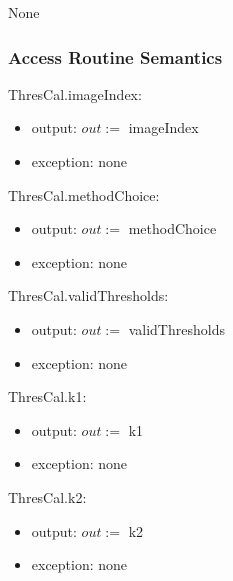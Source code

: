 \documentclass[12pt, titlepage]{article}
\begin{document}
None

\subsubsection{Access Routine Semantics}

\noindent ThresCal.imageIndex:
\begin{itemize}
\item output: $out :=$ imageIndex
\item exception: none 
\end{itemize}

\noindent ThresCal.methodChoice:
\begin{itemize}
\item output: $out :=$ methodChoice
\item exception: none 
\end{itemize}

\noindent ThresCal.validThresholds:
\begin{itemize}
\item output: $out :=$ validThresholds
\item exception: none 
\end{itemize}

\noindent ThresCal.k1:
\begin{itemize}
\item output: $out :=$ k1
\item exception: none 
\end{itemize}

\noindent ThresCal.k2:
\begin{itemize}
\item output: $out :=$ k2
\item exception: none 
\end{itemize}
\end{document}
